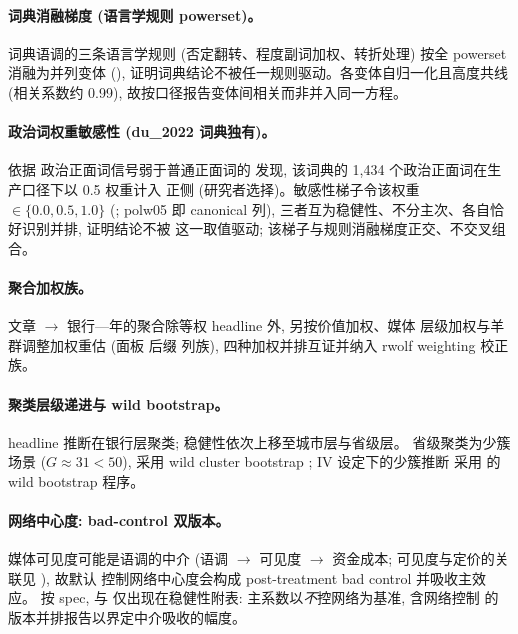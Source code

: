 \paragraph{词典消融梯度 (语言学规则 powerset)。}
词典语调的三条语言学规则 (否定翻转、程度副词加权、转折处理)
按全 powerset 消融为并列变体
(),
证明词典结论不被任一规则驱动。各变体自归一化且高度共线
(相关系数约 0.99), 故按口径报告变体间相关而非并入同一方程。

\paragraph{政治词权重敏感性 (du\_2022 词典独有)。}
依据 \textcite{du2022dictionary} 政治正面词信号弱于普通正面词的
发现, 该词典的 1{,}434 个政治正面词在生产口径下以 0.5 权重计入
正侧 (研究者选择)。敏感性梯子令该权重 $\in \{0.0, 0.5, 1.0\}$
(; polw05 即 canonical
列), 三者互为稳健性、不分主次、各自恰好识别并排, 证明结论不被
这一取值驱动; 该梯子与规则消融梯度正交、不交叉组合。

\paragraph{聚合加权族。}
文章 $\to$ 银行—年的聚合除等权 headline 外, 另按价值加权、媒体
层级加权与羊群调整加权重估 (面板  后缀
列族), 四种加权并排互证并纳入 rwolf weighting 校正族。

\paragraph{聚类层级递进与 wild bootstrap。}
headline 推断在银行层聚类; 稳健性依次上移至城市层与省级层。
省级聚类为少簇场景 ($G \approx 31 < 50$), 采用 wild cluster
bootstrap \parencite{mackinnon2017wild}; IV 设定下的少簇推断
采用 \textcite{wang2024wildiv} 的 wild bootstrap 程序。

\paragraph{网络中心度: bad-control 双版本。}
媒体可见度可能是语调的中介 (语调 $\to$ 可见度 $\to$ 资金成本;
可见度与定价的关联见 \textcite{fangperess2009media}), 故默认
控制网络中心度会构成 post-treatment bad control 并吸收主效应。
按 spec,  与 
仅出现在稳健性附表: 主系数以\emph{不}控网络为基准, 含网络控制
的版本并排报告以界定中介吸收的幅度。

